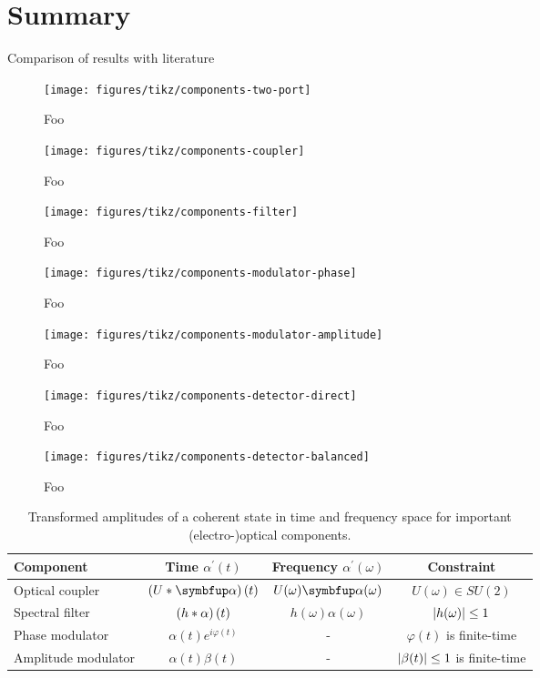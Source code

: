 \section*{Summary}

Comparison of results with literature

\begin{figure}[htb]
    \centering
    \texttt{[image: figures/tikz/components-two-port]}
    \caption{Foo}
\end{figure}

\begin{figure}[htb]
    \centering
    \texttt{[image: figures/tikz/components-coupler]}
    \caption{Foo}
\end{figure}

\begin{figure}[htb]
    \centering
    \texttt{[image: figures/tikz/components-filter]}
    \caption{Foo}
\end{figure}

\begin{figure}[htb]
    \centering
    \texttt{[image: figures/tikz/components-modulator-phase]}
    \caption{Foo}
\end{figure}

\begin{figure}[htb]
    \centering
    \texttt{[image: figures/tikz/components-modulator-amplitude]}
    \caption{Foo}
\end{figure}

\begin{figure}[htb]
    \centering
    \texttt{[image: figures/tikz/components-detector-direct]}
    \caption{Foo}
\end{figure}

\begin{figure}[htb]
    \centering
    \texttt{[image: figures/tikz/components-detector-balanced]}
    \caption{Foo}
\end{figure}

\begin{table}[htb]
	\centering	
	\begin{tabular}{lccc}
		\toprule
			Component & Time $\alpha^\prime(t)$ & Frequency $\alpha^\prime(\omega)$ & Constraint \\
		\midrule
			Optical coupler & $\left(U\conv\vb{\alpha}\right)(t)$ & $U(\omega)\vb{\alpha}(\omega)$ & $U(\omega)\in SU(2)$ \\
			Spectral filter & $\left(h\ast\alpha\right)(t)$ & $h(\omega)\alpha(\omega)$ & $\lvert h(\omega)\rvert\leq1$ \\
			Phase modulator & $\alpha(t)e^{i\varphi(t)}$ & - & $\varphi(t)$ is finite-time \\
			Amplitude modulator & $\alpha(t)\beta(t)$ & - & $\lvert\beta(t)\rvert\leq1$ is finite-time \\
		\bottomrule
	\end{tabular}
	\caption{Transformed amplitudes of a coherent state in time and frequency space for important (electro-)optical components.}
\end{table}

